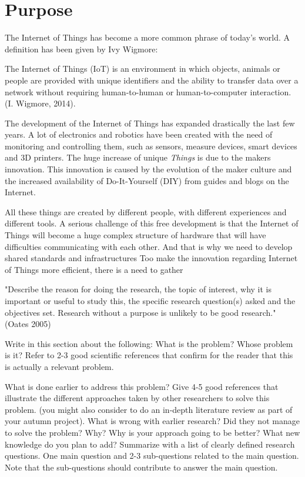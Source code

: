 \section{Purpose}

The Internet of Things has become a more common phrase of today's world. A definition has been given by Ivy Wigmore:

The Internet of Things (IoT) is an environment in which objects, animals or people are provided with unique identifiers and the ability to transfer data over a network without requiring human-to-human or human-to-computer interaction. (I. Wigmore, 2014).\cite{iotdefinition}

The development of the Internet of Things has expanded drastically the last few years. A lot of electronics and robotics have been created with the need of monitoring and controlling them, such as sensors, measure devices, smart devices and 3D printers. The huge increase of unique \textit{Things} is due to the makers innovation. This innovation is caused by the evolution of the maker culture and the increased availability of Do-It-Yourself (DIY) from guides and blogs on the Internet.

All these things are created by different people, with different experiences and different tools. A serious challenge of this free development is that the Internet of Things will become a huge complex structure of hardware that will have difficulties communicating with each other.\cite{standardChallenge} And that is why we need to develop shared standards and infrastructures Too make the innovation regarding Internet of Things more efficient, there is a need to gather 






"Describe the reason for doing the research, the topic of interest, why it is important or useful to study this, the specific research question(s) asked and the objectives set. Research without a purpose is unlikely to be good research." (Oates 2005)


Write in this section about the following:
What is the problem? Whose problem is it? Refer to 2-3 good scientific references that confirm for the reader that this is actually a relevant problem.


What is done earlier to address this problem? Give 4-5 good references that illustrate the different approaches taken by other researchers to solve this problem. (you might also consider to do an in-depth literature review as part of your autumn project).
What is wrong with earlier research? Did they not manage to solve the problem? Why? Why is your approach going to be better? What new knowledge do you plan to add?
Summarize with a list of clearly defined research questions. One main question and 2-3 sub-questions related to the main question. Note that the sub-questions should contribute to answer the main question.
